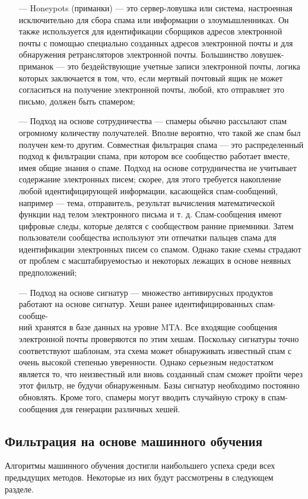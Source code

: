 \begin{itemize}
    \item[—] Honeypots (приманки) — это сервер-ловушка или система, настроенная исключительно для сбора спама или
        информации о злоумышленниках. Он также используется для идентификации сборщиков адресов электронной
        почты с помощью специально созданных адресов электронной почты и для обнаружения ретрансляторов
        электронной почты. Большинство ловушек-приманок — это бездействующие учетные записи электронной почты,
        логика которых заключается в том, что, если мертвый почтовый ящик не может согласиться на получение
        электронной почты, любой, кто отправляет это письмо, должен быть спамером;
    \item[—] Подход на основе сотрудничества — спамеры обычно рассылают спам огромному количеству получателей. Вполне вероятно, что такой же спам
        был получен кем-то другим. Совместная фильтрация спама — это распределенный подход к фильтрации спама,
        при котором все сообщество работает вместе, имея общие знания о спаме. Подход на основе сотрудничества
        не учитывает содержание электронных писем; скорее, для этого требуется накопление любой идентифицирующей
        информации, касающейся спам-сообщений, например — тема, отправитель, результат вычисления математической
        функции над телом электронного письма и т. д. Спам-сообщения имеют цифровые следы, которые делятся с
        сообществом ранние приемники. Затем пользователи сообщества используют эти отпечатки пальцев спама для
        идентификации электронных писем со спамом. Однако такие схемы страдают от проблем с
        масштабируемостью и некоторых лежащих в основе неявных предположений;
    \item[—] Подход на основе сигнатур — множество антивирусных продуктов работают на основе сигнатур. Хеши ранее
        идентифицированных спам-сообще-\\ний хранятся в базе данных на уровне MTA. Все входящие сообщения
        электронной почты проверяются по этим хешам. Поскольку сигнатуры точно соответствуют шаблонам,
        эта схема может обнаруживать известный спам с очень высокой степенью уверенности.
        Однако серьезным недостатком является то, что неизвестный или вновь созданный спам сможет
        пройти через этот фильтр, не будучи обнаруженным. Базы сигнатур необходимо постоянно обновлять.
        Кроме того, спамеры могут вводить случайную строку в спам-сообщения для генерации различных хешей.
\end{itemize}

\subsection{Фильтрация на основе машинного обучения}
Алгоритмы машинного обучения достигли наибольшего успеха среди
всех предыдущих методов. Некоторые из них будут рассмотрены в следующем разделе.
